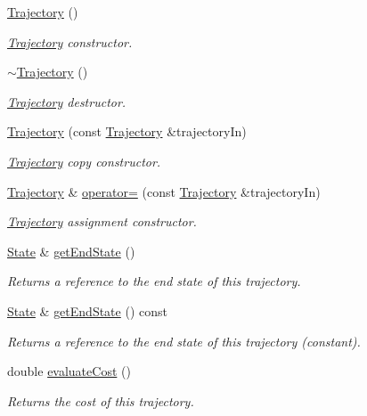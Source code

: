 \begin{DoxyCompactItemize}
\item 
\hyperlink{class_single_integrator_1_1_trajectory_aa340ba80f1f4d1aa39f19f069d5d8089}{Trajectory} ()
\begin{DoxyCompactList}\small\item\em \hyperlink{class_single_integrator_1_1_trajectory}{Trajectory} constructor. \end{DoxyCompactList}\item 
\hyperlink{class_single_integrator_1_1_trajectory_ac673c37025ca5353ad99ab41c936e75d}{$\sim$\-Trajectory} ()
\begin{DoxyCompactList}\small\item\em \hyperlink{class_single_integrator_1_1_trajectory}{Trajectory} destructor. \end{DoxyCompactList}\item 
\hyperlink{class_single_integrator_1_1_trajectory_a3d306ea0ffe940361824bdbee16767ad}{Trajectory} (const \hyperlink{class_single_integrator_1_1_trajectory}{Trajectory} \&trajectory\-In)
\begin{DoxyCompactList}\small\item\em \hyperlink{class_single_integrator_1_1_trajectory}{Trajectory} copy constructor. \end{DoxyCompactList}\item 
\hyperlink{class_single_integrator_1_1_trajectory}{Trajectory} \& \hyperlink{class_single_integrator_1_1_trajectory_ac99e8f9b6f17c594d28660e1df30e023}{operator=} (const \hyperlink{class_single_integrator_1_1_trajectory}{Trajectory} \&trajectory\-In)
\begin{DoxyCompactList}\small\item\em \hyperlink{class_single_integrator_1_1_trajectory}{Trajectory} assignment constructor. \end{DoxyCompactList}\item 
\hyperlink{class_single_integrator_1_1_state}{State} \& \hyperlink{class_single_integrator_1_1_trajectory_a07c015fe446625f00fecb4677298c506}{get\-End\-State} ()
\begin{DoxyCompactList}\small\item\em Returns a reference to the end state of this trajectory. \end{DoxyCompactList}\item 
\hyperlink{class_single_integrator_1_1_state}{State} \& \hyperlink{class_single_integrator_1_1_trajectory_a3500d806ea4fcc093a3d974c3debab9f}{get\-End\-State} () const 
\begin{DoxyCompactList}\small\item\em Returns a reference to the end state of this trajectory (constant). \end{DoxyCompactList}\item 
double \hyperlink{class_single_integrator_1_1_trajectory_aefa4bcabf72fbef3a892a826ae73d67c}{evaluate\-Cost} ()
\begin{DoxyCompactList}\small\item\em Returns the cost of this trajectory. \end{DoxyCompactList}\end{DoxyCompactItemize}
